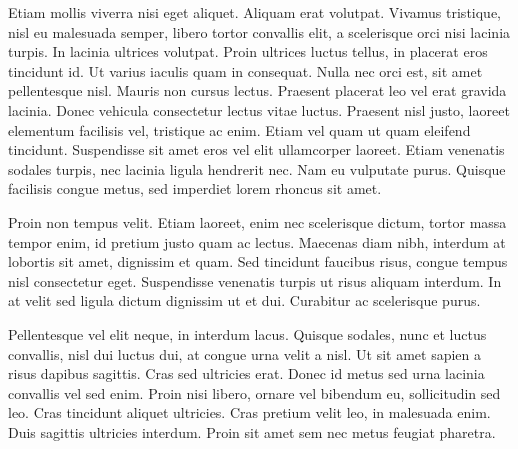 \documentclass[11pt,epsf]{article}
\begin{document}
\smallskip
\smallskip
\noindent
Etiam mollis viverra nisi eget aliquet. Aliquam erat volutpat. Vivamus
tristique, nisl eu malesuada semper, libero tortor convallis elit, a
scelerisque orci nisi lacinia turpis. In lacinia ultrices
volutpat. Proin ultrices luctus tellus, in placerat eros tincidunt
id. Ut varius iaculis quam in consequat. Nulla nec orci est, sit amet
pellentesque nisl. Mauris non cursus lectus. Praesent placerat leo vel
erat gravida lacinia. Donec vehicula consectetur lectus vitae
luctus. Praesent nisl justo, laoreet elementum facilisis vel,
tristique ac enim. Etiam vel quam ut quam eleifend
tincidunt. Suspendisse sit amet eros vel elit ullamcorper
laoreet. Etiam venenatis sodales turpis, nec lacinia ligula hendrerit
nec. Nam eu vulputate purus. Quisque facilisis congue metus, sed
imperdiet lorem rhoncus sit amet.

\smallskip
\smallskip
\noindent
Proin non tempus velit. Etiam laoreet, enim nec scelerisque dictum,
tortor massa tempor enim, id pretium justo quam ac lectus. Maecenas
diam nibh, interdum at lobortis sit amet, dignissim et quam. Sed
tincidunt faucibus risus, congue tempus nisl consectetur
eget. Suspendisse venenatis turpis ut risus aliquam interdum. In at
velit sed ligula dictum dignissim ut et dui. Curabitur ac scelerisque
purus.

\smallskip
\smallskip
\noindent
Pellentesque vel elit neque, in interdum lacus. Quisque sodales, nunc
et luctus convallis, nisl dui luctus dui, at congue urna velit a
nisl. Ut sit amet sapien a risus dapibus sagittis. Cras sed ultricies
erat. Donec id metus sed urna lacinia convallis vel sed enim. Proin
nisi libero, ornare vel bibendum eu, sollicitudin sed leo. Cras
tincidunt aliquet ultricies. Cras pretium velit leo, in malesuada
enim. Duis sagittis ultricies interdum. Proin sit amet sem nec metus
feugiat pharetra.
\end{document}
